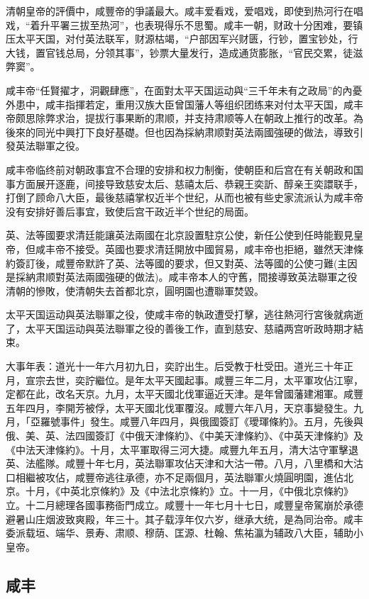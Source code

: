 清朝皇帝的評價中，咸豐帝的爭議最大。咸丰爱看戏，爱唱戏，即使到热河行在唱戏，“着升平署三拔至热河”，也表現得乐不思蜀。咸丰一朝，财政十分困难，要镇压太平天国，对付英法联军，财源枯竭，“户部因军兴财匮，行钞，置宝钞处，行大钱，置官钱总局，分领其事”，钞票大量发行，造成通货膨胀，“官民交累，徒滋弊窦”。

咸丰帝“任賢擢才，洞觀肆應”，在面對太平天国运动與“三千年未有之政局”的內憂外患中，咸丰指揮若定，重用汉族大臣曾国藩人等组织团练来对付太平天国，咸丰帝颇思除弊求治，提拔行事果断的肃顺，并支持肃顺等人在朝政上推行的改革。為後來的同光中興打下良好基礎。但也因為採納肃顺對英法兩國強硬的做法，導致引發英法聯軍之役。

咸丰帝临终前对朝政事宜不合理的安排和权力制衡，使朝臣和后宫在有关朝政和国事方面展开逐鹿，间接导致慈安太后、慈禧太后、恭親王奕訢、醇亲王奕譞联手，打倒了顾命八大臣，最後慈禧掌权近半个世纪，从而也被有些史家流派认为咸丰帝没有安排好善后事宜，致使后宫干政近半个世纪的局面。

英、法等國要求清廷能讓英法兩國在北京設置駐京公使，新任公使到任時能觐見皇帝，但咸丰帝不接受。英國也要求清廷開放中國貿易，咸丰帝也拒絕，雖然天津條約簽訂後，咸豐帝默許了英、法等國的要求，但又對英、法等國的公使刁難(主因是採納肃顺對英法兩國強硬的做法)。咸丰帝本人的守舊，間接導致英法聯軍之役清朝的慘敗，使清朝失去首都北京，圓明園也遭聯軍焚毀。

太平天国运动與英法聯軍之役，使咸丰帝的執政遭受打擊，逃往熱河行宮後就病逝了，太平天国运动與英法聯軍之役的善後工作，直到慈安、慈禧两宫听政時期才結束。

大事年表：道光十一年六月初九日，奕詝出生。后受教于杜受田。道光三十年正月，宣宗去世，奕詝繼位。是年太平天國起事。咸豐三年二月，太平軍攻佔江寧，定都在此，改名天京。九月，太平天國北伐軍逼近天津。是年曾國藩建湘軍。咸豐五年四月，李開芳被俘，太平天國北伐軍覆沒。咸豐六年八月，天京事變發生。九月，「亞羅號事件」發生。咸豐八年四月，與俄國簽訂《璦琿條約》。五月，先後與俄、美、英、法四國簽訂《中俄天津條約》、《中美天津條約》、《中英天津條約》及《中法天津條約》。十月，太平軍取得三河大捷。咸豐九年五月，清大沽守軍擊退英、法艦隊。咸豐十年七月，英法聯軍攻佔天津和大沽一帶。八月，八里橋和大沽口相繼被攻佔，咸豐帝逃往承德，亦不足兩個月，英法聯軍火燒圓明園，進佔北京。十月，《中英北京條約》及《中法北京條約》立。十一月，《中俄北京條約》立。十二月總理各國事務衙門成立。咸豐十一年七月十七日，咸豐皇帝駕崩於承德避暑山庄烟波致爽殿，年三十。其子载淳年仅六岁，继承大统，是為同治帝。咸丰委派载垣、端华、景寿、肃顺、穆荫、匡源、杜翰、焦祐瀛为辅政八大臣，辅助小皇帝。

\subsection{咸丰}

